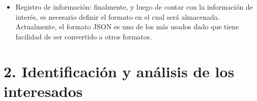 \documentclass[
11pt, %
]{charter}
\begin{document}
\begin{•}
\begin{itemize}
\item Registro de información: finalmente, y luego de contar con la información de interés, es necesario definir el formato en el cual será almacenada. Actualmente, el formato JSON es uno de los más usados dado que tiene facilidad de ser convertido a otros formatos.
\end{itemize}





\end{•}


\section{2. Identificación y análisis de los interesados}
\label{sec:interesados}
\end{document}
